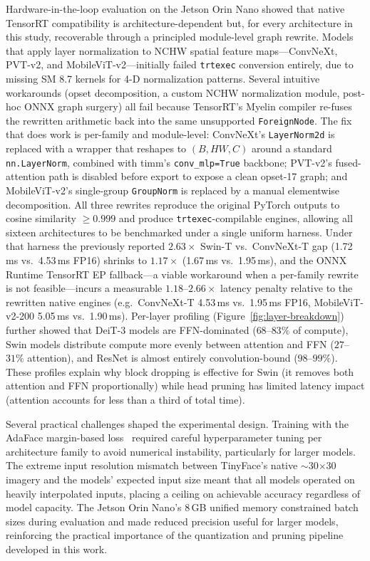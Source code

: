 \documentclass[runningheads,a4paper]{llncs}
\begin{document}
Hardware-in-the-loop evaluation on the Jetson Orin Nano showed that native TensorRT compatibility is architecture-dependent but, for every architecture in this study, recoverable through a principled module-level graph rewrite. Models that apply layer normalization to NCHW spatial feature maps---ConvNeXt, PVT-v2, and MobileViT-v2---initially failed \texttt{trtexec} conversion entirely, due to missing SM 8.7 kernels for 4-D normalization patterns. Several intuitive workarounds (opset decomposition, a custom NCHW normalization module, post-hoc ONNX graph surgery) all fail because TensorRT's Myelin compiler re-fuses the rewritten arithmetic back into the same unsupported \texttt{ForeignNode}. The fix that does work is per-family and module-level: ConvNeXt's \texttt{LayerNorm2d} is replaced with a wrapper that reshapes to $(B,HW,C)$ around a standard \texttt{nn.LayerNorm}, combined with timm's \texttt{conv\_mlp=True} backbone; PVT-v2's fused-attention path is disabled before export to expose a clean opset-17 graph; and MobileViT-v2's single-group \texttt{GroupNorm} is replaced by a manual elementwise decomposition. All three rewrites reproduce the original PyTorch outputs to cosine similarity $\geq 0.999$ and produce \texttt{trtexec}-compilable engines, allowing all sixteen architectures to be benchmarked under a single uniform harness. Under that harness the previously reported $2.63\times$ Swin-T vs.\ ConvNeXt-T gap (1.72\,ms vs.\ 4.53\,ms FP16) shrinks to $1.17\times$ (1.67\,ms vs.\ 1.95\,ms), and the ONNX Runtime TensorRT EP fallback---a viable workaround when a per-family rewrite is not feasible---incurs a measurable $1.18$--$2.66\times$ latency penalty relative to the rewritten native engines (e.g.\ ConvNeXt-T 4.53\,ms vs.\ 1.95\,ms FP16, MobileViT-v2-200 5.05\,ms vs.\ 1.90\,ms). Per-layer profiling (Figure~\ref{fig:layer-breakdown}) further showed that DeiT-3 models are FFN-dominated ($68$--$83\%$ of compute), Swin models distribute compute more evenly between attention and FFN ($27$--$31\%$ attention), and ResNet is almost entirely convolution-bound ($98$--$99\%$). These profiles explain why block dropping is effective for Swin (it removes both attention and FFN proportionally) while head pruning has limited latency impact (attention accounts for less than a third of total time).

Several practical challenges shaped the experimental design. Training with the AdaFace margin-based loss~\cite{narayan2025petalface} required careful hyperparameter tuning per architecture family to avoid numerical instability, particularly for larger models. The extreme input resolution mismatch between TinyFace's native $\sim$30$\times$30 imagery and the models' expected input size meant that all models operated on heavily interpolated inputs, placing a ceiling on achievable accuracy regardless of model capacity. The Jetson Orin Nano's 8\,GB unified memory constrained batch sizes during evaluation and made reduced precision useful for larger models, reinforcing the practical importance of the quantization and pruning pipeline developed in this work.
\end{document}

